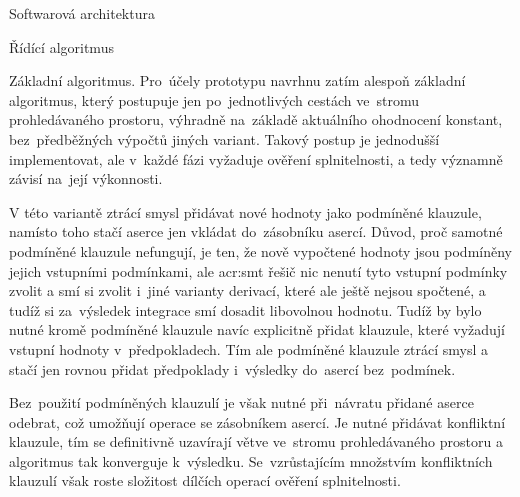 \documentclass[thesis=M,czech]{FITthesis}[2012/06/26]
\newcommand{\acrlabel}[1]{acr:#1}
\newcommand{\acr}[1]{\acrshort{\acrlabel{#1}}}
\begin{document}
\begin{section}{Softwarová architektura}
\begin{subsection}{Řídící algoritmus}

\begin{paragraph}{Základní algoritmus.}
\label{ss:design:arch:alg:basic}
Pro~účely prototypu navrhnu zatím alespoň základní algoritmus,
který postupuje jen po~jednotlivých
cestách ve~stromu prohledávaného prostoru,
výhradně na~základě aktuálního ohodnocení konstant,
bez~předběžných výpočtů jiných variant.
Takový postup je jednodušší implementovat,
ale v~každé fázi vyžaduje ověření splnitelnosti,
a tedy významně závisí na~její výkonnosti.

V této variantě ztrácí smysl přidávat
nové hodnoty jako podmíněné klauzule,
namísto toho stačí aserce jen vkládat do~zásobníku asercí.
Důvod, proč samotné podmíněné klauzule nefungují,
je ten, že nově vypočtené hodnoty
jsou podmíněny jejich vstupními podmínkami,
ale \acr{smt} řešič nic nenutí tyto vstupní podmínky zvolit
a smí si zvolit i~jiné varianty derivací,
které ale ještě nejsou spočtené,
a tudíž si za~výsledek integrace smí dosadit libovolnou hodnotu.
Tudíž by bylo nutné kromě podmíněné klauzule
navíc explicitně přidat klauzule,
které vyžadují vstupní hodnoty v~předpokladech.
Tím ale podmíněné klauzule ztrácí smysl
a stačí jen rovnou přidat předpoklady
i~výsledky do~asercí bez~podmínek.

Bez~použití podmíněných klauzulí
je však nutné při~návratu
přidané aserce odebrat,
což umožňují operace se zásobníkem asercí.
Je nutné přidávat konfliktní klauzule,
tím se definitivně uzavírají větve
ve~stromu prohledávaného prostoru
a algoritmus tak konverguje k~výsledku.
Se~vzrůstajícím množstvím konfliktních klauzulí
však roste složitost dílčích operací ověření splnitelnosti.


\end{paragraph}
\end{subsection}
\end{section}
\end{document}
